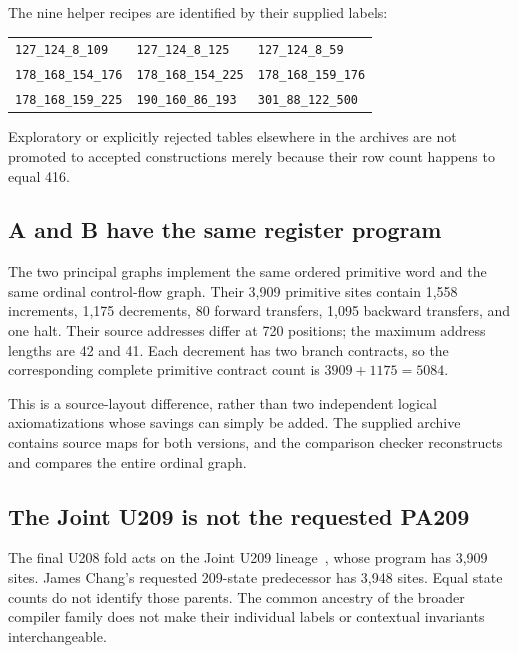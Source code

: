 \documentclass[11pt,letterpaper]{article}
\newcommand{\code}[1]{\texttt{\nolinkurl{#1}}}
\begin{document}
The nine helper recipes are identified by their supplied labels:
\begin{center}\small
\begin{tabular}{@{}lll@{}}
\toprule
\code{127_124_8_109} & \code{127_124_8_125} & \code{127_124_8_59}\\
\code{178_168_154_176} & \code{178_168_154_225} & \code{178_168_159_176}\\
\code{178_168_159_225} & \code{190_160_86_193} & \code{301_88_122_500}\\
\bottomrule
\end{tabular}
\end{center}
Exploratory or explicitly rejected tables elsewhere in the archives are
not promoted to accepted constructions merely because their row count
happens to equal 416.

\subsection{A and B have the same register program}

The two principal graphs implement the same ordered primitive word and
the same ordinal control-flow graph. Their 3,909 primitive sites contain
1,558 increments, 1,175 decrements, 80 forward transfers, 1,095 backward
transfers, and one halt. Their source addresses differ at 720 positions;
the maximum address lengths are 42 and 41. Each decrement has two branch
contracts, so the corresponding complete primitive contract count is
\(3909+1175=5084\).

This is a source-layout difference, rather than two independent logical
axiomatizations whose savings can simply be added. The supplied archive
contains source maps for both versions, and the comparison checker
reconstructs and compares the entire ordinal graph.

\subsection{The Joint U209 is not the requested PA209}

The final U208 fold acts on the Joint U209 lineage~\cite{incoming}, whose program has
3,909 sites. James Chang's requested 209-state predecessor has 3,948
sites. Equal state counts do not identify those parents. The common
ancestry of the broader compiler family does not make their individual
labels or contextual invariants interchangeable.
\end{document}
